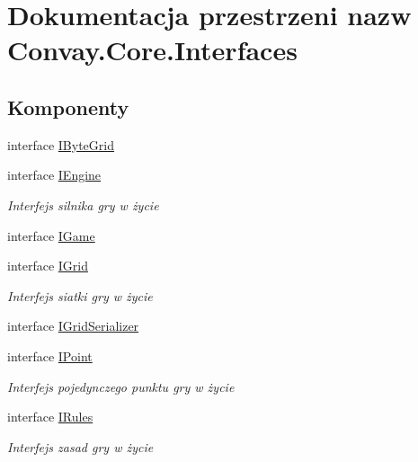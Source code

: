 \hypertarget{namespace_convay_1_1_core_1_1_interfaces}{}\section{Dokumentacja przestrzeni nazw Convay.\+Core.\+Interfaces}
\label{namespace_convay_1_1_core_1_1_interfaces}
\subsection*{Komponenty}
\begin{DoxyCompactItemize}
\item 
interface \hyperlink{interface_convay_1_1_core_1_1_interfaces_1_1_i_byte_grid}{I\+Byte\+Grid}
\item 
interface \hyperlink{interface_convay_1_1_core_1_1_interfaces_1_1_i_engine}{I\+Engine}
\begin{DoxyCompactList}\small\item\em Interfejs silnika gry w życie \end{DoxyCompactList}\item 
interface \hyperlink{interface_convay_1_1_core_1_1_interfaces_1_1_i_game}{I\+Game}
\item 
interface \hyperlink{interface_convay_1_1_core_1_1_interfaces_1_1_i_grid}{I\+Grid}
\begin{DoxyCompactList}\small\item\em Interfejs siatki gry w życie \end{DoxyCompactList}\item 
interface \hyperlink{interface_convay_1_1_core_1_1_interfaces_1_1_i_grid_serializer}{I\+Grid\+Serializer}
\item 
interface \hyperlink{interface_convay_1_1_core_1_1_interfaces_1_1_i_point}{I\+Point}
\begin{DoxyCompactList}\small\item\em Interfejs pojedynczego punktu gry w życie \end{DoxyCompactList}\item 
interface \hyperlink{interface_convay_1_1_core_1_1_interfaces_1_1_i_rules}{I\+Rules}
\begin{DoxyCompactList}\small\item\em Interfejs zasad gry w życie \end{DoxyCompactList}\end{DoxyCompactItemize}
